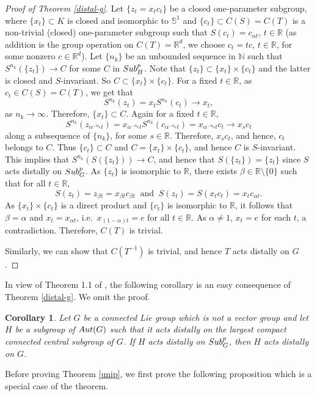 \documentclass{amsart}
\numberwithin{equation}{section}
\newcommand{\Aut}{{\rm Aut}}
\newcommand{\N}{{\mathbb N}}
\newcommand{\R}{{\mathbb R}}
\newcommand{\Sc}{{\mathbb S}}
\newcommand{\spg}{{\rm Sub}^p_G}
\newcommand{\spp}{{\rm Sub}^{p}}
\let\ap=\alpha
\let\mi=\setminus
\newtheorem{cor}[thm]{Corollary}
\theoremstyle{remark}
\begin{document}
\begin{proof}[Proof of Theorem {\rm\ref{distal-g}}]
Let $\{z_t=x_tc_t\}$ be a closed one-parameter subgroup, where  $\{x_t\}\subset K$ is closed and isomorphic 
to $\Sc^1$ and $\{c_t\}\subset C(S)=C(T)$ is a non-trivial (closed) one-parameter subgroup such that 
$S(c_t)=c_{\ap t}$, $t\in\R$ (as addition is the group operation on $C(T)=\R^d$, we choose $c_t=tc$, $t\in\R$,  
for some nonzero  $c\in \R^d$). Let $\{n_k\}$ be an unbounded sequence in $\N$ such that 
$S^{n_k}(\{z_t\})\to C$ for some $C$ in $\spp_{H}$. Note that 
$\{z_t\}\subset \{x_t\}\times \{c_t\}$ and the latter is closed and $S$-invariant. 
So $C\subset \{x_t\}\times\{c_t\}$. For a fixed $t\in\R$, as $c_t\in C(S)=C(T)$, we get that
$$
S^{n_k}(z_t)=x_t S^{n_k}(c_t)\to x_t,$$ 
 as $n_k\to\infty$. Therefore, $\{x_t\}\subset C$. Again for a fixed $t\in\R$, 
$$S^{n_k}(z_{\ap^{-n_k}t})=
x_{\ap^{-n_k}t}S^{n_k}(c_{\ap^{-n_k}t})=x_{\ap^{-n_k}t}c_t\to x_sc_t$$ 
along a subsequence of $\{n_k\}$, for some $s\in\R$. 
Therefore, $x_sc_t$, and hence, $c_t$ belongs to $C$. Thus $\{c_t\}\subset C$ and  
$C=\{x_t\}\times \{c_t\}$, and hence $C$ is $S$-invariant. 
This implies that $S^{n_k}(S(\{z_t\}))\to C$, and hence that $S(\{z_t\})=\{z_t\}$ since $S$ acts distally on $\spg$. 
As $\{z_t\}$ is isomorphic to $\R$, there exists $\beta\in\R\mi\{0\}$ such that for all $t\in\R$, 
$$
S(z_t)=z_{\beta t}=x_{\beta t}c_{\beta t}\  \mbox{ and }\  
S(z_t)=S(x_tc_t)=x_tc_{\ap t}.$$ 
As $\{x_t\}\times \{c_t\}$ is a direct product and $\{c_t\}$ is isomorphic to $\R$, it follows that 
$\beta=\alpha$ and $x_t=x_{\ap t}$, i.e.\ $x_{(1-\ap)t}=e$ for all $t\in\R$. As $\ap\ne 1$, 
$x_t=e$ for each $t$, a contradiction. Therefore, $C(T)$ is trivial. 

Similarly, we can show that $C(T^{-1})$ is trivial, and hence $T$ acts distally on $G$. 
\end{proof}

In view of Theorem 1.1 of \cite{Ab2}, the following corollary is an easy consequence of Theorem \ref{distal-g}. 
We omit the proof.

\begin{cor} \label{distal-subgp} Let $G$ be a connected Lie group which is not a vector group and let $H$ be a 
subgroup of $\Aut(G)$ such that it acts distally on the largest compact connected central subgroup of $G$. 
If $H$ acts distally on $\spg$, then $H$ acts distally on $G$. 
\end{cor}

Before proving Theorem \ref{unip}, we first prove the following proposition which is a special case of the theorem. 
\end{document}
